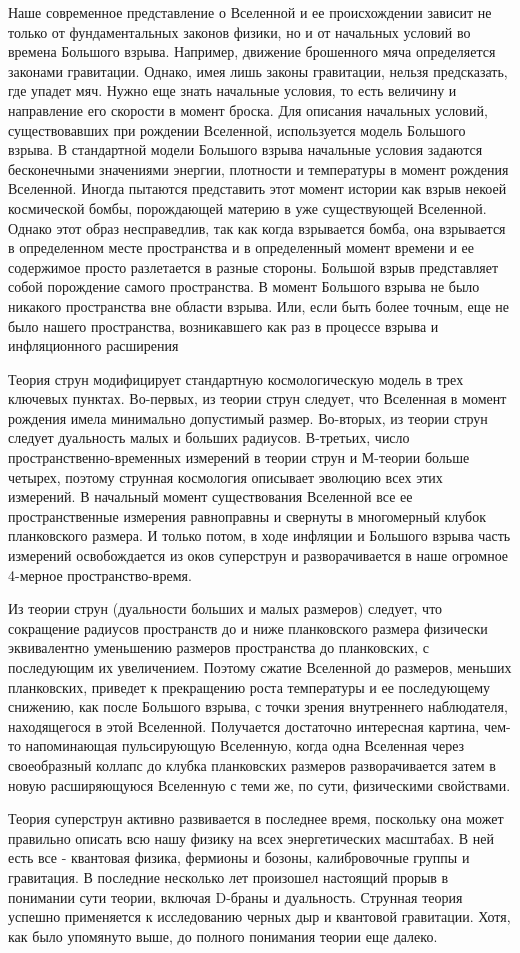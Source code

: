 Наше современное представление о Вселенной и ее происхождении зависит не только от фундаментальных законов физики, но и от начальных условий во времена Большого взрыва. Например, движение брошенного мяча определяется законами гравитации. Однако, имея лишь законы гравитации, нельзя предсказать, где упадет мяч. Нужно еще знать начальные условия, то есть величину и направление его скорости в момент броска. Для описания начальных условий, существовавших при рождении Вселенной, используется модель Большого взрыва. В стандартной модели Большого взрыва начальные условия задаются бесконечными значениями энергии, плотности и температуры в момент рождения Вселенной. Иногда пытаются представить этот момент истории как взрыв некоей космической бомбы, порождающей материю в уже существующей Вселенной. Однако этот образ несправедлив, так как когда взрывается бомба, она взрывается в определенном месте пространства и в определенный момент времени и ее содержимое просто разлетается в разные стороны. Большой взрыв представляет собой порождение самого пространства. В момент Большого взрыва не было никакого пространства вне области взрыва. Или, если быть более точным, еще не было нашего пространства, возникавшего как раз в процессе взрыва и инфляционного расширения

Теория струн модифицирует стандартную космологическую модель в трех ключевых пунктах. Во-первых, из теории струн следует, что Вселенная в момент рождения имела минимально допустимый размер. Во-вторых, из теории струн следует дуальность малых и больших радиусов. В-третьих, число пространственно-временных измерений в теории струн и М-теории больше четырех, поэтому струнная космология описывает эволюцию всех этих измерений. В начальный момент существования Вселенной все ее пространственные измерения равноправны и свернуты в многомерный клубок планковского размера. И только потом, в ходе инфляции и Большого взрыва часть измерений освобождается из оков суперструн и разворачивается в наше огромное 4-мерное пространство-время. 

Из теории струн (дуальности больших и малых размеров) следует, что сокращение радиусов пространств до и ниже планковского размера физически эквивалентно уменьшению размеров пространства до планковских, с последующим их увеличением. Поэтому сжатие Вселенной до размеров, меньших планковских, приведет к прекращению роста температуры и ее последующему снижению, как после Большого взрыва, с точки зрения внутреннего наблюдателя, находящегося в этой Вселенной. Получается достаточно интересная картина, чем-то напоминающая пульсирующую Вселенную, когда одна Вселенная через своеобразный коллапс до клубка планковских размеров разворачивается затем в новую расширяющуюся Вселенную с теми же, по сути, физическими свойствами.

Теория суперструн активно развивается в последнее время, поскольку она может правильно описать всю нашу физику на всех энергетических масштабах. В ней есть все - квантовая физика, фермионы и бозоны, калибровочные группы и гравитация. В последние несколько лет произошел настоящий прорыв в понимании сути теории, включая D-браны и дуальность. Струнная теория успешно применяется к исследованию черных дыр и квантовой гравитации. Хотя, как было упомянуто выше, до полного понимания теории еще далеко.